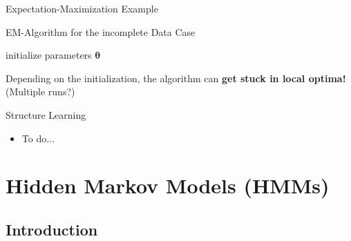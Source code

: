 \begin{frame}{Expectation-Maximization Example}{}
\end{frame}


\begin{frame}{EM-Algorithm for the incomplete Data Case}{}
	\begin{algorithm}[H]
		\DontPrintSemicolon
		\footnotesize
		initialize parameters $\bm{\theta}$\;
 		\caption{Expectation-Maximization Algorithm}
	\end{algorithm}

	\vspace*{2mm}
	\begin{boxBlueNoFrame}
		 Depending on the initialization, the algorithm can \textbf{get stuck in local optima!}
		(Multiple runs?)
	\end{boxBlueNoFrame}
\end{frame}


\begin{frame}{Structure Learning}{}
	\begin{itemize}
		\item To do...
	\end{itemize}
\end{frame}


\section{Hidden Markov Models (HMMs)}

\subsection{Introduction}

